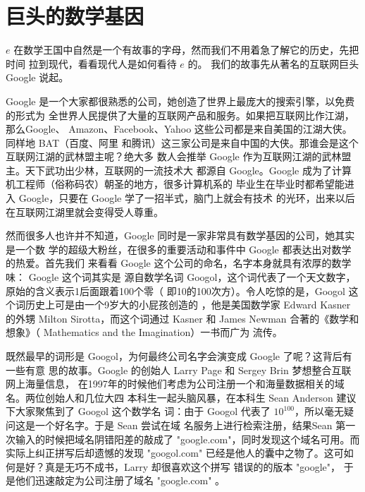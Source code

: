 \section{巨头的数学基因}
$e$ 在数学王国中自然是一个有故事的字母，然而我们不用着急了解它的历史，先把时间
拉到现代，看看现代人是如何看待 $e$ 的。 我们的故事先从著名的互联网巨头 Google 
说起。

Google 是一个大家都很熟悉的公司，她创造了世界上最庞大的搜索引擎，以免费的形式为
全世界人民提供了大量的互联网产品和服务。如果把互联网比作江湖，那么Google、
Amazon、Facebook、Yahoo 这些公司都是来自美国的江湖大侠。同样地 BAT（百度、阿里
和腾讯）这三家公司是来自中国的大侠。那谁会是这个互联网江湖的武林盟主呢？绝大多
数人会推举 Google 作为互联网江湖的武林盟主。天下武功出少林，互联网的一流技术大
都源自 Google。Google 成为了计算机工程师（俗称码农）朝圣的地方，很多计算机系的
毕业生在毕业时都希望能进入 Google，只要在 Google 学了一招半式，脑门上就会有技术
的光环，出来以后在互联网江湖里就会变得受人尊重。

然而很多人也许并不知道，Google 同时是一家非常具有数学基因的公司，她其实是一个数
学的超级大粉丝，在很多的重要活动和事件中 Google 都表达出对数学的热爱。首先我们
来看看 Google 这个公司的命名，名字本身就具有浓厚的数学味： Google 这个词其实是
源自数学名词 Googol，这个词代表了一个天文数字，原始的含义表示1后面跟着100个零（
即10的100次方）。令人吃惊的是，Googol 这个词历史上可是由一个9岁大的小屁孩创造的
，他是美国数学家 Edward Kasner 的外甥 Milton Sirotta，而这个词通过 Kasner 和
James Newman 合著的《数学和想象》（ Mathematics and the Imagination）一书而广为
流传。

既然最早的词形是 Googol，为何最终公司名字会演变成 Google 了呢？这背后有一些有意
思的故事。Google 的创始人 Larry Page 和 Sergey Brin 梦想整合互联网上海量信息，
在1997年的时候他们考虑为公司注册一个和海量数据相关的域名。两位创始人和几位大四
本科生一起头脑风暴，在本科生 Sean Anderson 建议下大家聚焦到了 Googol 这个数学名
词：由于 Googol 代表了 $10^{100}$，所以毫无疑问这是一个好名字。于是 Sean 尝试在域
名服务上进行检索注册，结果Sean 第一次输入的时候把域名阴错阳差的敲成了
"google.com"，同时发现这个域名可用。而实际上纠正拼写后却遗憾的发现 "googol.com"
已经是他人的囊中之物了。这可如何是好？真是无巧不成书，Larry 却很喜欢这个拼写
错误的的版本 "google"， 于是他们迅速敲定为公司注册了域名 "google.com" 。

